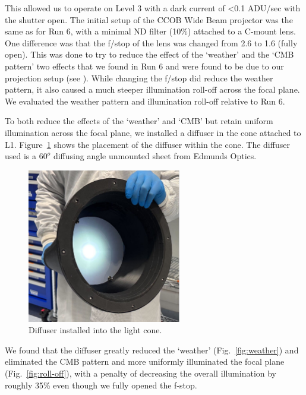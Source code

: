 This allowed us to operate on Level 3 with a dark current of
\textless0.1 ADU/sec with the shutter open. The initial setup of the
CCOB Wide Beam projector was the same as for Run 6, with a minimal ND filter (10\%)
attached to a C-mount lens. One difference was that the f/stop of the lens
was changed from 2.6 to 1.6 (fully open). This was done to try to
reduce the effect of the `weather' and
the `CMB pattern' two effects that we
found in Run 6 and were found to be due to our projection setup (see
\citet{2024arXiv241113386B}). While changing  the f/stop  did
reduce the weather pattern, it also caused a much steeper illumination roll-off
across the focal plane. We evaluated the weather pattern and illumination roll-off relative to Run 6.


To both reduce the effects of the
`weather' and
`CMB' but retain uniform illumination
across the focal plane, we installed a diffuser in the cone attached to
L1. Figure~\ref{fig:diffuser} shows the placement of the diffuser within the cone.  The diffuser used is a $60^o$ diffusing angle unmounted sheet from Edmunds Optics.

\begin{figure}[ht]
\centering
\includegraphics[width=0.6\textwidth]{figures/Diffuser.jpg}
\caption{Diffuser installed into the light cone.}
\label{fig:diffuser}
\end{figure}

We found that the diffuser greatly reduced the `weather' (Fig.~\ref{fig:weather}) and eliminated the CMB pattern and more uniformly illuminated the focal plane (Fig.~\ref{fig:roll-off}), with a penalty of decreasing the overall illumination by roughly 35\% even though we fully opened the f-stop.


